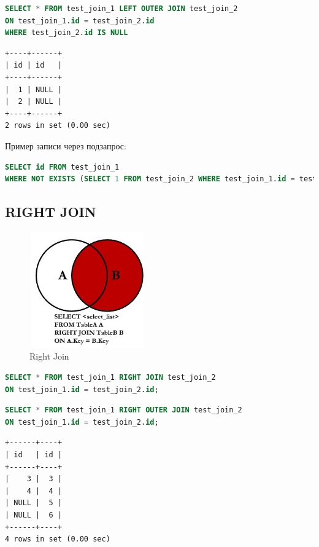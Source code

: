 \documentclass[12pt,a4paper]{article}
\begin{document}
\begin{lstlisting}[language=SQL]
SELECT * FROM test_join_1 LEFT OUTER JOIN test_join_2 
ON test_join_1.id = test_join_2.id
WHERE test_join_2.id IS NULL
\end{lstlisting}

\begin{lstlisting}[basicstyle = \tiny\ttfamily, columns = fixed]
    +----+------+
| id | id   |
+----+------+
|  1 | NULL |
|  2 | NULL |
+----+------+
2 rows in set (0.00 sec)
\end{lstlisting}

Пример записи через подзапрос:

\begin{lstlisting}[language=SQL]
SELECT id FROM test_join_1
WHERE NOT EXISTS (SELECT 1 FROM test_join_2 WHERE test_join_1.id = test_join_2.id)
\end{lstlisting}

\subsection{RIGHT JOIN}

\begin{figure}[!ht]
    \includegraphics[width=5cm,height=5cm]{images/Lab5/right_join.jpg}
    \caption{Right Join}
    \label{fig:RightJoin}
\end{figure}

\begin{lstlisting}[language=SQL]
SELECT * FROM test_join_1 RIGHT JOIN test_join_2 
ON test_join_1.id = test_join_2.id;
\end{lstlisting}

\begin{lstlisting}[language=SQL]
SELECT * FROM test_join_1 RIGHT OUTER JOIN test_join_2 
ON test_join_1.id = test_join_2.id;
\end{lstlisting}

\begin{lstlisting}[basicstyle = \tiny\ttfamily, columns = fixed]
+------+----+
| id   | id |
+------+----+
|    3 |  3 |
|    4 |  4 |
| NULL |  5 |
| NULL |  6 |
+------+----+
4 rows in set (0.00 sec)
\end{lstlisting}
\end{document}
